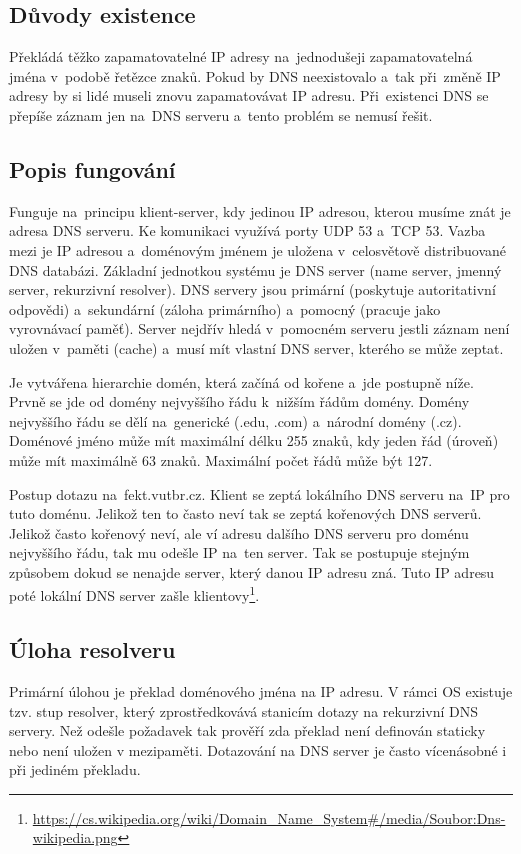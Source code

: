 \subsection{Důvody existence}
Překládá těžko zapamatovatelné IP adresy na~jednodušeji zapamatovatelná jména v~podobě řetězce znaků.
Pokud by DNS neexistovalo a~tak při~změně IP adresy by si lidé museli znovu zapamatovávat IP adresu.
Při~existenci DNS se přepíše záznam jen na~DNS serveru a~tento problém se nemusí řešit.

\subsection{Popis fungování}

Funguje na~principu klient-server, kdy jedinou IP adresou, kterou musíme znát je adresa DNS serveru.
Ke komunikaci využívá porty UDP 53 a~TCP 53.
Vazba mezi je IP adresou a~doménovým jménem je uložena v~celosvětově distribuované DNS databázi.
Základní jednotkou systému je DNS server (name server, jmenný server, rekurzivní resolver).
DNS servery jsou primární (poskytuje autoritativní odpovědi) a~sekundární (záloha primárního) a~pomocný (pracuje jako vyrovnávací paměť).
Server nejdřív hledá v~pomocném serveru jestli záznam není uložen v~paměti (cache) a~musí mít vlastní DNS server, kterého se může zeptat.

Je vytvářena hierarchie domén, která začíná od kořene a~jde postupně níže.
Prvně se jde od domény nejvyššího řádu k~nižším řádům domény.
Domény nejvyššího řádu se dělí na~generické (.edu, .com) a~národní domény (.cz).
Doménové jméno může mít maximální délku 255 znaků, kdy jeden řád (úroveň) může mít maximálně 63 znaků. Maximální počet řádů může být 127.

Postup dotazu na~fekt.vutbr.cz.
Klient se zeptá lokálního DNS serveru na~IP pro tuto doménu.
Jelikož ten to často neví tak se zeptá kořenových DNS serverů.
Jelikož často kořenový neví, ale ví adresu dalšího DNS serveru pro doménu nejvyššího řádu, tak mu odešle IP na~ten server.
Tak se postupuje stejným způsobem dokud se nenajde server, který danou IP adresu zná.
Tuto IP adresu poté lokální DNS server zašle klientovy\footnote{\url{https://cs.wikipedia.org/wiki/Domain_Name_System\#/media/Soubor:Dns-wikipedia.png}}.

\subsection{Úloha resolveru}

Primární úlohou je překlad doménového jména na IP adresu.
V rámci OS existuje tzv. stup resolver, který zprostředkovává stanicím dotazy na rekurzivní DNS servery.
Než odešle požadavek tak prověří zda překlad není definován staticky nebo není uložen v mezipaměti.
Dotazování na DNS server je často vícenásobné i při jediném překladu.

